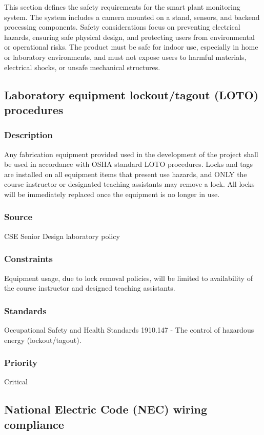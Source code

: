 This section defines the safety requirements for the smart plant monitoring system. The system includes a camera mounted on a stand, sensors, and backend processing components. Safety considerations focus on preventing electrical hazards, ensuring safe physical design, and protecting users from environmental or operational risks. The product must be safe for indoor use, especially in home or laboratory environments, and must not expose users to harmful materials, electrical shocks, or unsafe mechanical structures.
\subsection{Laboratory equipment lockout/tagout (LOTO) procedures}
\subsubsection{Description}
Any fabrication equipment provided used in the development of the project shall be used in accordance with OSHA standard LOTO procedures. Locks and tags are installed on all equipment items that present use hazards, and ONLY the course instructor or designated teaching assistants may remove a lock. All locks will be immediately replaced once the equipment is no longer in use.
\subsubsection{Source}
CSE Senior Design laboratory policy
\subsubsection{Constraints}
Equipment usage, due to lock removal policies, will be limited to availability of the course instructor and designed teaching assistants.
\subsubsection{Standards}
Occupational Safety and Health Standards 1910.147 - The control of hazardous energy (lockout/tagout).
\subsubsection{Priority}
Critical

\subsection{National Electric Code (NEC) wiring compliance}
